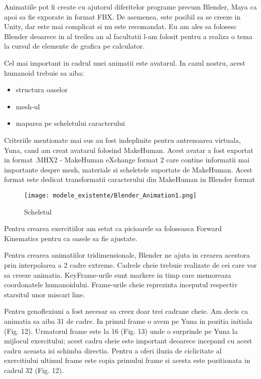 \documentclass[12pt,a4paper]{report}
\begin{document}
Animatiile pot fi create cu ajutorul diferitelor programe precum Blender, Maya ca apoi sa fie exporate in format FBX. De asemenea, este posibil sa se creeze in Unity, dar este mai complicat si nu este recomandat. Eu am ales sa folosesc Blender deoarece in al treilea an al facultatii l-am folosit pentru a realiza o tema la cursul de elemente de grafica pe calculator.

Cel mai important in cadrul unei animatii este avatarul. In cazul nostru, acest humanoid trebuie sa aiba:
\begin{itemize}
    \item structura oaselor
    \item mesh-ul
    \item maparea pe scheletului caracterului
\end{itemize}

Criteriile mentionate mai sus au fost indeplinite pentru antrenoarea virtuala, Yuna, cand am creat avatarul folosind MakeHuman. Acest avatar a fost exportat in format .MHX2 - MakeHuman eXchange format 2 care contine informatii mai importante despre mesh, materiale si scheletele suportate de MakeHuman. Acest format este dedicat transformatii caracterului din MakeHuman in Blender format

\begin{figure}[th]
\centering
\texttt{[image: modele\_existente/Blender\_Animation1.png]}
  \caption[Scheletul]{Scheletul\protect\footnotemark}
  \label{figure_1:picture_10}
\end{figure}

Pentru crearea exercitiilor am setat ca picioarele sa foloseasca Forward Kinematics pentru ca oasele sa fie ajustate.

Pentru crearea animatiilor tridimensionale, Blender ne ajuta in crearea acestora prin interpolarea a 2 cadre extreme. Cadrele cheie trebuie realizate de cei care vor sa creeze animatia. KeyFrame-urile sunt markere in timp care memoreaza coordonatele humanoidului. Frame-urile cheie reprezinta inceputul respectiv starsitul unor miscari line.

Pentru genoflexiuni a fost necesar sa creez doar trei cadrane cheie. Am decis ca animatia sa aiba 31 de cadre. In primul frame o avem pe Yuna in pozitia initiala (Fig. 12). Urmatorul frame este la 16 (Fig. 13) unde o surprinde pe Yuna la mijlocul exercitului; acest cadru cheie este important deoarece incepand cu acest cadru aceasta isi schimba directia. Pentru a oferi iluzia de ciclicitate al exercitiului ultimul frame este copia primului frame si acesta este pozitionata in cadrul 32 (Fig. 12). 
\end{document}

